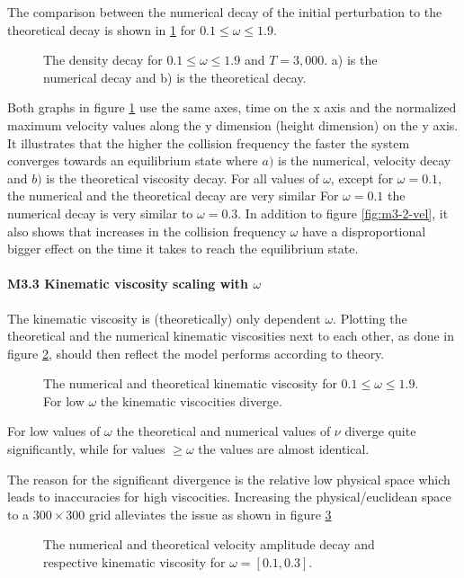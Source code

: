\documentclass[a4paper,11pt, oneside]{book}
\begin{document}
The comparison between the numerical decay of the initial perturbation to the theoretical decay is shown in \ref{fig:m3-2-norm-vel} for $0.1 \leq \omega \leq 1.9 $.
\begin{figure}[ht]
\centering
\resizebox{\columnwidth}{!}{\large}
\vspace*{-10mm}
\caption[Normalized density decay]{The density decay for $0.1 \leq \omega \leq 1.9 $ and $T=3,000$. a) is the numerical decay and b) is the theoretical decay.}
\label{fig:m3-2-norm-vel}
\end{figure}
Both graphs in figure \ref{fig:m3-2-norm-vel} use the same axes, time on the x axis and the normalized maximum velocity values along the y dimension (height dimension) on the y axis.
It illustrates that the higher the collision frequency the faster the system converges towards an equilibrium state where $a)$ is the numerical, velocity decay and $b)$ is the theoretical viscosity decay.
For all values of $\omega$, except for $\omega=0.1$, the numerical and the theoretical decay are very similar
For $\omega=0.1$ the numerical decay is very similar to $\omega=0.3$.
In addition to figure \ref{fig:m3-2-vel}, it also shows that  increases in the collision frequency $\omega$ have a disproportional bigger effect on the time it takes to reach the equilibrium state.


\paragraph{M3.3 Kinematic viscosity scaling with $\omega$}
The kinematic viscosity is (theoretically) only dependent $\omega$. 
Plotting the theoretical and the numerical kinematic viscosities next to each other, as done in figure \ref{fig:m3-3-kinematic-viscocity}, should then reflect the model performs according to theory. 
\begin{figure}[ht]
\centering
\resizebox{0.8\columnwidth}{!}{\large}
\caption[Kinematic viscosity]{The numerical and theoretical kinematic viscosity for $0.1 \leq \omega \leq 1.9 $. For low $\omega$ the kinematic viscocities diverge.}
\label{fig:m3-3-kinematic-viscocity}
\end{figure}
For low values of $\omega$ the theoretical and numerical values of $\nu$ diverge quite significantly, while for values $\geq\omega$ the values are almost identical.

The reason for the significant divergence is the relative low physical space which leads to inaccuracies for high viscocities. Increasing the physical/euclidean space to a $300\times300$ grid alleviates the issue as shown in figure \ref{fig:m3-3-update}
\begin{figure}[ht]
\centering
\resizebox{0.8\columnwidth}{!}{\large}
\caption[Kinematic viscosity]{The numerical and theoretical velocity amplitude decay and respective kinematic viscosity for $\omega=[0.1, 0.3] $.}
\label{fig:m3-3-update}
\end{figure}
\end{document}

